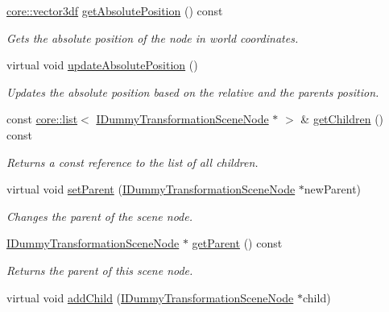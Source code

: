\begin{DoxyCompactItemize}
\item 
\hyperlink{namespaceirr_1_1core_a06f169d08b5c429f5575acb7edbad811}{core\+::vector3df} \hyperlink{classirr_1_1scene_1_1IDummyTransformationSceneNode_a8c3e2a52fcd61512316f134d2a29f562}{get\+Absolute\+Position} () const 
\begin{DoxyCompactList}\small\item\em Gets the absolute position of the node in world coordinates. \end{DoxyCompactList}\item 
virtual void \hyperlink{classirr_1_1scene_1_1IDummyTransformationSceneNode_ae2d53618b7d24167526d980c434fbe22}{update\+Absolute\+Position} ()
\begin{DoxyCompactList}\small\item\em Updates the absolute position based on the relative and the parents position. \end{DoxyCompactList}\item 
const \hyperlink{classirr_1_1core_1_1list}{core\+::list}$<$ \hyperlink{classirr_1_1scene_1_1IDummyTransformationSceneNode}{I\+Dummy\+Transformation\+Scene\+Node} $\ast$ $>$ \& \hyperlink{classirr_1_1scene_1_1IDummyTransformationSceneNode_aed89b962b30a41070c2c5cb42e97845b}{get\+Children} () const 
\begin{DoxyCompactList}\small\item\em Returns a const reference to the list of all children. \end{DoxyCompactList}\item 
virtual void \hyperlink{classirr_1_1scene_1_1IDummyTransformationSceneNode_a3a3e9ed634ccb3a0b9744f93529ecc31}{set\+Parent} (\hyperlink{classirr_1_1scene_1_1IDummyTransformationSceneNode}{I\+Dummy\+Transformation\+Scene\+Node} $\ast$new\+Parent)
\begin{DoxyCompactList}\small\item\em Changes the parent of the scene node. \end{DoxyCompactList}\item 
\hyperlink{classirr_1_1scene_1_1IDummyTransformationSceneNode}{I\+Dummy\+Transformation\+Scene\+Node} $\ast$ \hyperlink{classirr_1_1scene_1_1IDummyTransformationSceneNode_a8f36007bafc2bebbbc8008adda7ecd61}{get\+Parent} () const 
\begin{DoxyCompactList}\small\item\em Returns the parent of this scene node. \end{DoxyCompactList}\item 
virtual void \hyperlink{classirr_1_1scene_1_1IDummyTransformationSceneNode_ab77154a16a662029a795706d2e4942b7}{add\+Child} (\hyperlink{classirr_1_1scene_1_1IDummyTransformationSceneNode}{I\+Dummy\+Transformation\+Scene\+Node} $\ast$child)

\end{DoxyCompactItemize}
